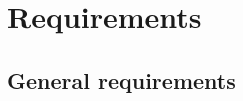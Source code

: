 \section{Requirements}

\subsection{General requirements}
\begin{table}[h!]
    \begin{ReqTable}
    \ReqHeader
    \end{ReqTable}
\end{table}

